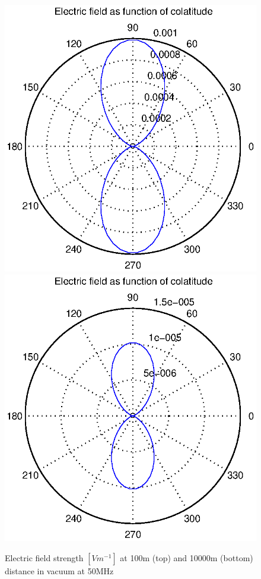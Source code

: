\documentclass[a4paper,11pt]{thesis}
\begin{document}
\begin{figure}
\begin{center}
  \includegraphics[width=11.5cm]{DissPics/NFvac100m50MHz.eps}
 \includegraphics[width=11.5cm]{DissPics/NFvac10000m50MHz.eps}
  \caption{Electric field strength $[Vm^{-1}]$ at 100m (top) and 10000m (bottom) distance in vacuum at 50MHz}\label{figNFvac100m50MHz}
  \end{center}
\end{figure}
\end{document}
